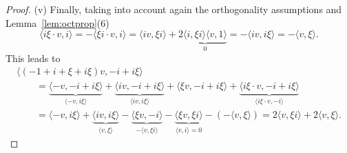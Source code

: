 \documentclass[pdftex]{sigma}
\numberwithin{equation}{section}
\begin{document}
\begin{proof}
(v) Finally, taking into account again the orthogonality assumptions and Lemma~\ref{lem:octprop}(6)
 \[ \langle i\xi\cdot v,i\rangle= - \langle \xi i\cdot v,i\rangle =\langle iv,\xi i \rangle+ 2\underbrace{ \langle i,\xi i \rangle \langle v,1 \rangle}_{0}=-\langle iv,i\xi \rangle=-\langle v,\xi \rangle.\]
 This leads to
 \begin{gather}
 \langle (-1+i+\xi+i\xi)v, -i+i\xi \rangle \nonumber \\
 \qquad{}= \underbrace{\langle -v, -i+i\xi \rangle}_{\langle -v, i\xi \rangle} + \underbrace{\langle iv,-i+i\xi \rangle}_{\langle iv,i\xi \rangle} + \langle \xi v,-i+i\xi \rangle+ \underbrace{\langle i\xi\cdot v, -i+i\xi \rangle}_{\langle i\xi\cdot v, -i \rangle} \nonumber\\
 \qquad{}= \langle -v, i\xi \rangle+\underbrace{\langle iv,i\xi \rangle}_{\langle v,\xi \rangle}-\underbrace{\langle \xi v,-i \rangle}_{-\langle v,\xi i \rangle}-\underbrace{\langle \xi v,\xi i \rangle}_{\langle v,i \rangle = 0}-(-\langle v,\xi \rangle)=2 \langle v, \xi i \rangle+2\langle v,\xi \rangle.
 \label{eq:gxginvst5}
 \end{gather}


\end{proof}
\end{document}
